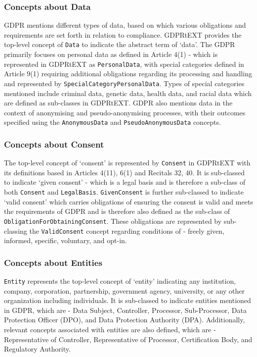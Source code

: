 \subsubsection{Concepts about Data}
GDPR mentions different types of data, based on which various obligations and requirements are set forth in relation to compliance. GDPRtEXT provides the top-level concept of \texttt{Data} to indicate the abstract term of `data'.
The GDPR primarily focuses on personal data as defined in Article 4(1) - which is represented in GDPRtEXT as \texttt{PersonalData}, with special categories defined in Article 9(1) requiring additional obligations regarding its processing and handling and represented by \texttt{SpecialCategoryPersonalData}. Types of special categories mentioned include criminal data, genetic data, health data, and racial data which are defined as sub-classes in GDPRtEXT.
GDPR also mentions data in the context of anonymising and pseudo-anonymising processes, with their outcomes specified using the \texttt{AnonymousData} and \texttt{PseudoAnonymousData} concepts.

\subsubsection{Concepts about Consent}
The top-level concept of `consent' is represented by \texttt{Consent} in GDPRtEXT with its definitions based in Articles 4(11), 6(1) and Recitals 32, 40. It is sub-classed to indicate `given consent' - which is a legal basis and is therefore a sub-class of both \texttt{Consent} and \texttt{LegalBasis}. \texttt{GivenConsent} is further sub-classed to indicate `valid consent' which carries obligations of ensuring the consent is valid and meets the requirements of GDPR and is therefore also defined as the sub-class of \texttt{ObligationForObtainingConsent}. These obligations are represented by sub-classing the \texttt{ValidConsent} concept regarding conditions of - freely given, informed, specific, voluntary, and opt-in.

\subsubsection{Concepts about Entities}
\texttt{Entity} represents the top-level concept of `entity' indicating any institution, company, corporation, partnership, government agency, university, or any other organization including individuals. 
It is sub-classed to indicate entities mentioned in GDPR, which are - Data Subject, Controller, Processor, Sub-Processor, Data Protection Officer (DPO), and Data Protection Authority (DPA). Additionally, relevant concepts associated with entities are also defined, which are -  Representative of Controller, Representative of Processor, Certification Body, and Regulatory Authority.

